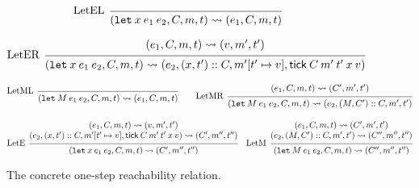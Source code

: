 \documentclass[acmsmall,review]{acmart}\settopmatter{printfolios=true,printccs=false,printacmref=false}
\theoremstyle{definition}
\newcommand*{\cons}{::}
\newcommand*{\mem}{m}
\newcommand*{\tick}{\mathsf{tick}}
\begin{document}
\begin{figure}[h!]
  \[
    \begin{prooftree}
      \infer[left label=LetEL]0{
      (\mathtt{let}\:x\:e_1\:e_2, C, \mem, t)
      \rightsquigarrow
      (e_{1}, C, \mem, t)
      }
    \end{prooftree}
  \]

  \[
    \begin{prooftree}
      \hypo{
        \begin{matrix}
          (e_{1}, C, \mem, t)
          \rightsquigarrow
          (v, \mem', t')
        \end{matrix}
      }
      \infer[left label=LetER]1{
      (\mathtt{let}\:x\:e_1\:e_2, C, \mem, t)
      \rightsquigarrow
      (e_{2}, (x, t')\cons C, \mem'[t'\mapsto v], \tick\:C\:\mem'\:t'\:x\:v)
      }
    \end{prooftree}
  \]

  \[
    \begin{prooftree}
      \infer[left label=LetML]0{
      (\mathtt{let}\:M\:e_{1}\:e_{2}, C, \mem, t)
      \rightsquigarrow
      (e_{1}, C, \mem, t)
      }
    \end{prooftree}\qquad
    \begin{prooftree}
      \hypo{
        \begin{matrix}
          (e_{1}, C, \mem, t)
          \rightsquigarrow
          (C', \mem', t')
        \end{matrix}
      }
      \infer[left label=LetMR]1{
      (\mathtt{let}\:M\:e_{1}\:e_{2}, C, \mem, t)
      \rightsquigarrow
      (e_{2}, (M, C')\cons C, \mem', t')
      }
    \end{prooftree}
  \]

  \[
    \begin{prooftree}
      \hypo{
        \begin{matrix}
          (e_{1}, C, \mem, t)
          \rightsquigarrow
          (v, \mem', t') \\
          (e_{2}, (x, t')\cons C, \mem'[t'\mapsto v], \tick\:C\:\mem'\:t'\:x\:v)
          \rightsquigarrow
          (C', \mem'', t'')
        \end{matrix}
      }
      \infer[left label=LetE]1{
      (\mathtt{let}\:x\:e_1\:e_2, C, \mem, t)
      \rightsquigarrow
      (C', \mem'', t'')
      }
    \end{prooftree}\quad
    \begin{prooftree}
      \hypo{
        \begin{matrix}
          (e_{1}, C, \mem, t)
          \rightsquigarrow
          (C', \mem', t') \\
          (e_{2}, (M, C')\cons C, \mem', t')
          \rightsquigarrow
          (C'', \mem'', t'')
        \end{matrix}
      }
      \infer[left label=LetM]1{
      (\mathtt{let}\:M\:e_{1}\:e_{2}, C, \mem, t)
      \rightsquigarrow
      (C'', \mem'', t'')
      }
    \end{prooftree}
  \]
  \caption{The concrete one-step reachability relation.}
  \label{fig:concreach}
\end{figure}
\end{document}
